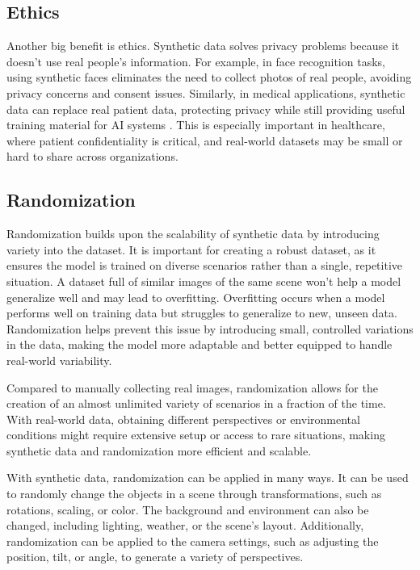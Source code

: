 \subsection{Ethics}
Another big benefit is ethics. Synthetic data solves privacy problems because it doesn’t use real people’s information. For example, in face recognition tasks, using synthetic faces eliminates the need to collect photos of real people, avoiding privacy concerns and consent issues. Similarly, in medical applications, synthetic data can replace real patient data, protecting privacy while still providing useful training material for AI systems . This is especially important in healthcare, where patient confidentiality is critical, and real-world datasets may be small or hard to share across organizations. \cite{jimaging8110310}

\subsection{Randomization}
Randomization builds upon the scalability of synthetic data by introducing variety into the dataset. It is important for creating a robust dataset, as it ensures the model is trained on diverse scenarios rather than a single, repetitive situation.\cite{borkman2021unityperceptiongeneratesynthetic} A dataset full of similar images of the same scene won’t help a model generalize well and may lead to overfitting. Overfitting occurs when a model performs well on training data but struggles to generalize to new, unseen data. \cite{Ying_2019} Randomization helps prevent this issue by introducing small, controlled variations in the data, making the model more adaptable and better equipped to handle real-world variability.

Compared to manually collecting real images, randomization allows for the creation of an almost unlimited variety of scenarios in a fraction of the time. With real-world data, obtaining different perspectives or environmental conditions might require extensive setup or access to rare situations, making synthetic data and randomization more efficient and scalable. \cite{borkman2021unityperceptiongeneratesynthetic}

With synthetic data, randomization can be applied in many ways. It can be used to randomly change the objects in a scene through transformations, such as rotations, scaling, or color. The background and environment can also be changed, including lighting, weather, or the scene’s layout. Additionally, randomization can be applied to the camera settings, such as adjusting the position, tilt, or angle, to generate a variety of perspectives. \cite{borkman2021unityperceptiongeneratesynthetic}


